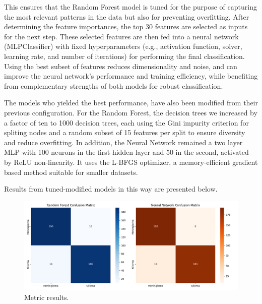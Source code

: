 \documentclass[11pt,a4paper]{article}
\begin{document}
		This ensures that the Random Forest model is tuned for the purpose of capturing
		the most relevant patterns in the data but also for preventing overfitting. 
		After determining the feature importances, the top 30 features are selected as inputs for the next step.
		These selected features are then fed into a neural network (MLPClassifier) 
		with fixed hyperparameters (e.g., activation function, solver, learning rate, and number of iterations) for
		performing the final classification. 
		Using the best subset of features reduces dimensionality and noise, and can improve the 
		neural network’s performance and training efficiency, 
		while benefiting from complementary strengths of both models for robust classification.
	

		The models who yielded the best performance, 
		have also been modified from their previous configuration.
		For the Random Forest, the decision trees we increased by a factor of ten to 1000 decision trees, 
		each using the Gini impurity criterion for spliting  nodes and a random subset of 15 features per split
		to ensure diversity and reduce overfitting. 
		In addition, the Neural Network remained a two layer MLP with 100 neurons in the first hidden layer and 
		50 in the second, activated by ReLU non-linearity. 
		It uses the L-BFGS optimizer, a memory-efficient gradient based method 
		suitable for smaller datasets. 


		Results from tuned-modified models in this way are presented below.


		\begin{figure}[H]
			\centering
			\includegraphics[width=1.1\textwidth]{images/metrics_hyper.png}
			\caption{Metric results.}
			\label{fig1:}
		\end{figure}		
\end{document}
